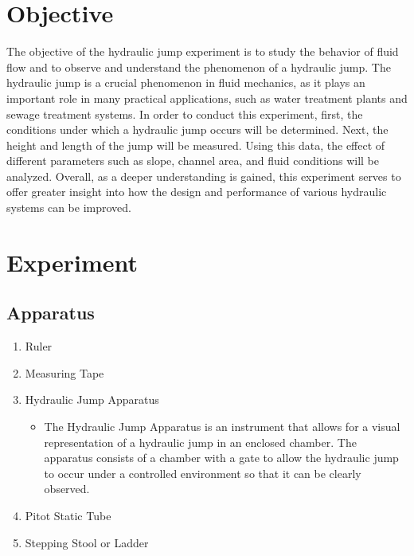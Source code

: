 \documentclass{article}
\begin{document}

\newpage
\doublespacing
\tableofcontents
\newpage
{}
\listoftables
{}
\listoffigures
\newpage
\section{Objective} 
\par The objective of the hydraulic jump experiment is to study the behavior of fluid flow and to observe and understand the phenomenon of a hydraulic jump. The hydraulic jump is a crucial phenomenon in fluid mechanics, as it plays an important role in many practical applications, such as water treatment plants and sewage treatment systems. In order to conduct this experiment, first, the conditions under which a hydraulic jump occurs will be determined. Next, the height and length of the jump will be measured. Using this data, the effect of different parameters such as slope, channel area, and fluid conditions will be analyzed. Overall, as a deeper understanding is gained, this experiment serves to offer greater insight into how the design and performance of various hydraulic systems can be improved. 

\newpage
\section{Experiment}
\subsection{Apparatus}
\begin{enumerate}
    \item Ruler 
    \item Measuring Tape
    \item Hydraulic Jump Apparatus
    \begin{itemize}
        \item The Hydraulic Jump Apparatus is an instrument that allows for a visual representation of a hydraulic jump in an enclosed chamber. The apparatus consists of a chamber with a gate to allow the hydraulic jump to occur under a controlled environment so that it can be clearly observed.
    \end{itemize}
    \item Pitot Static Tube 
    \item Stepping Stool or Ladder
\end{enumerate}
\end{document}
